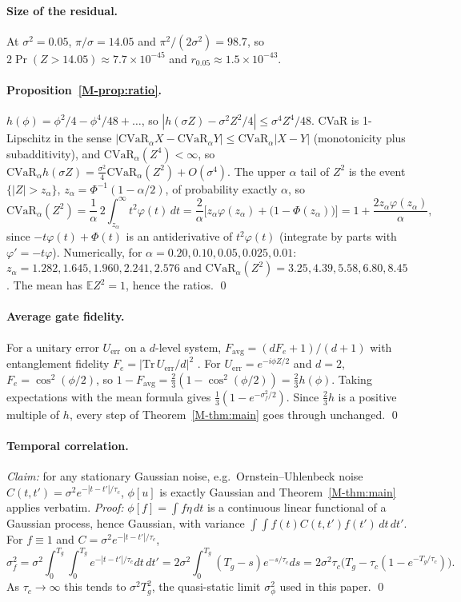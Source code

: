\documentclass[aps,pra,onecolumn,notitlepage,superscriptaddress,nofootinbib,floatfix]{revtex4-2}
\newcommand{\cvar}{\mathrm{CVaR}}
\newcommand{\E}{\mathbb{E}}
\begin{document}
\paragraph*{Size of the residual.} At $\sigma^2=0.05$,
$\pi/\sigma=14.05$ and $\pi^2/(2\sigma^2)=98.7$, so
$2\Pr(Z>14.05)\approx7.7\times10^{-45}$ and
$r_{0.05}\approx1.5\times10^{-43}$.

\paragraph*{Proposition~\ref{M-prop:ratio}.} $h(\phi)=\phi^2/4-\phi^4/48+\dots$,
so $|h(\sigma Z)-\sigma^2Z^2/4|\le\sigma^4Z^4/48$. CVaR is 1-Lipschitz in the
sense $|\cvar_\alpha X-\cvar_\alpha Y|\le\cvar_\alpha|X-Y|$ (monotonicity plus
subadditivity), and $\cvar_\alpha(Z^4)<\infty$, so
$\cvar_\alpha h(\sigma Z)=\tfrac{\sigma^2}{4}\cvar_\alpha(Z^2)+O(\sigma^4)$. The
upper $\alpha$ tail of $Z^2$ is the event $\{|Z|>z_\alpha\}$,
$z_\alpha=\Phi^{-1}(1-\alpha/2)$, of probability exactly $\alpha$, so
\[
\cvar_\alpha(Z^2)=\frac1\alpha\,2\!\int_{z_\alpha}^\infty t^2\varphi(t)\,dt
=\frac2\alpha\Big[z_\alpha\varphi(z_\alpha)+\big(1-\Phi(z_\alpha)\big)\Big]
=1+\frac{2z_\alpha\varphi(z_\alpha)}{\alpha},
\]
since $-t\varphi(t)+\Phi(t)$ is an antiderivative of $t^2\varphi(t)$
(integrate by parts with $\varphi'=-t\varphi$).
Numerically, for $\alpha=0.20,0.10,0.05,0.025,0.01$:
$z_\alpha=1.282,1.645,1.960,2.241,2.576$ and
$\cvar_\alpha(Z^2)=3.25,4.39,5.58,6.80,8.45$. The mean has $\E Z^2=1$, hence
the ratios. \qed

\paragraph*{Average gate fidelity.} For a unitary error $U_{\mathrm{err}}$
on a $d$-level system, $F_{\mathrm{avg}}=(dF_e+1)/(d+1)$ with entanglement
fidelity $F_e=|\mathrm{Tr}\,U_{\mathrm{err}}/d|^2$ \cite{Nielsen2002}. For
$U_{\mathrm{err}}=e^{-i\phi Z/2}$ and $d=2$, $F_e=\cos^2(\phi/2)$, so
$1-F_{\mathrm{avg}}=\tfrac23(1-\cos^2(\phi/2))=\tfrac23h(\phi)$. Taking
expectations with the mean formula gives
$\tfrac13(1-e^{-\sigma_f^2/2})$. Since $\tfrac23h$ is a positive multiple of
$h$, every step of Theorem~\ref{M-thm:main} goes through unchanged. \qed

\label{sec:proofs-ext}\paragraph*{Temporal correlation.} \emph{Claim:} for any stationary Gaussian noise, e.g.\ Ornstein--Uhlenbeck noise $C(t,t')=\sigma^2e^{-|t-t'|/\tau_c}$, $\phi[u]$ is exactly Gaussian and Theorem~\ref{M-thm:main} applies verbatim. \emph{Proof:} $\phi[f]=\int f\eta\,dt$ is a
continuous linear functional of a Gaussian process, hence Gaussian, with
variance $\int\!\!\int f(t)C(t,t')f(t')\,dt\,dt'$. For $f\equiv1$ and
$C=\sigma^2e^{-|t-t'|/\tau_c}$,
\[
\sigma_f^2=\sigma^2\!\int_0^{T_g}\!\!\int_0^{T_g}e^{-|t-t'|/\tau_c}dt\,dt'
=2\sigma^2\!\int_0^{T_g}(T_g-s)e^{-s/\tau_c}ds
=2\sigma^2\tau_c\big(T_g-\tau_c(1-e^{-T_g/\tau_c})\big).
\]
As $\tau_c\to\infty$ this tends to $\sigma^2T_g^2$, the quasi-static limit
$\sigma_\phi^2$ used in this paper. \qed
\end{document}
